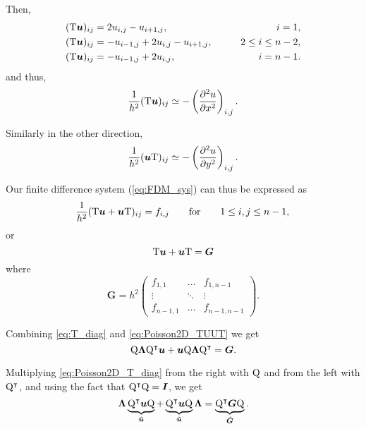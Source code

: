 Then,
\begin{alignat*}{2}
  ({\mathrm T} {{\boldsymbol u}})_{ij} &= 2u_{i,j} - u_{i+1,j}, & \qquad i=1, \\
  ({\mathrm T} {{\boldsymbol u}})_{ij} &= -u_{i-1,j}+2u_{i,j} - u_{i+1,j}, &\qquad 2 \leq i \leq n-2, \\
  ({\mathrm T} {{\boldsymbol u}})_{ij} &= -u_{i-1,j}+2u_{i,j}, &\qquad i=n-1.
\end{alignat*}
and thus,
\begin{equation}
  \frac{1}{h^2} ({\mathrm T} {{\boldsymbol u}})_{ij} \simeq
  - \left( \frac{\partial^2 u}{\partial x^2} \right)_{i,j}.
\end{equation}

Similarly in the other direction,
\begin{equation}
  \frac{1}{h^2} ({{\boldsymbol u}} {\mathrm T})_{ij} \simeq
  - \left( \frac{\partial^2 u}{\partial y^2} \right)_{i,j}.
\end{equation}

Our finite difference system (\ref{eq:FDM_sys}) can thus be expressed as
\begin{equation*}
  \frac{1}{h^2} ({\mathrm T} {{\boldsymbol u}} + {{\boldsymbol u}} {\mathrm T})_{ij} = f_{i,j}
  \qquad \text{for} \qquad 1 \leq i,j \leq n-1, \\
\end{equation*}
or
\begin{equation}
  {\mathrm T} {{\boldsymbol u}} + {{\boldsymbol u}} {\mathrm T} = \boldsymbol G
  \label{eq:Poisson2D_TUUT}
\end{equation}
where
\begin{equation*}
  \bm G = h^2
  \begin{pmatrix}
    f_{1,1} & \ldots & f_{1,n-1} \\
    \vdots & \ddots & \vdots \\
    f_{n-1,1} & \ldots & f_{n-1,n-1}
  \end{pmatrix}.
\end{equation*}

Combining \eqref{eq:T_diag} and \eqref{eq:Poisson2D_TUUT} we get
\begin{equation}
  {\mathrm Q} \boldsymbol \Lambda {\mathrm Q}^\intercal {{\boldsymbol u}} + {{\boldsymbol u}} {\mathrm Q} \boldsymbol \Lambda {\mathrm Q}^\intercal = \boldsymbol {G}.
  \label{eq:Poisson2D_T_diag}
\end{equation}

Multiplying \eqref{eq:Poisson2D_T_diag} from the right with ${\mathrm Q}$ and from the
left with ${\mathrm Q}^\intercal$, and using the fact that ${\mathrm Q}^\intercal {\mathrm Q} =
\boldsymbol I$, we get
\begin{equation*}
  \boldsymbol \Lambda \underbrace{{\mathrm Q}^\intercal {{\boldsymbol u}} {\mathrm Q}}_{\tilde{{{\boldsymbol u}}}} +
  \underbrace{{\mathrm Q}^\intercal {{\boldsymbol u}} {\mathrm Q}}_{\tilde{{{\boldsymbol u}}}} \boldsymbol \Lambda =
  \underbrace{{\mathrm Q}^\intercal \boldsymbol G {\mathrm Q}}_{\tilde{\boldsymbol G}}.
\end{equation*}

